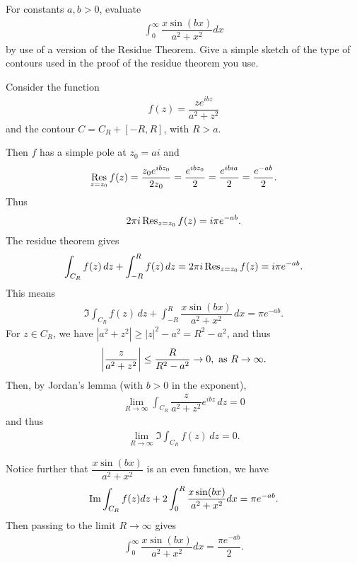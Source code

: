 \begin{problem}
\label{prob:xsinbx}For constants $a,b>0$, evaluate 
\begin{align*}
    \int_0^\infty\dfrac{x\sin(bx)}{a^2+x^2}dx
\end{align*}
by use of a version of the Residue Theorem. Give a simple sketch of the type of contours used in the proof of the residue theorem you use.
\begin{solution}
Consider the function 
\begin{align*}
    f(z)=\dfrac{ze^{ibz}}{a^2+z^2}
\end{align*}
and the contour $C=C_R+[-R,R]$, with $R>a.$ 

Then $f$ has a simple pole at $z_0=ai$ and 
\begin{align*}
    \mathop{\rm Res}_{z=z_0}f(z)=\dfrac{z_0e^{ibz_0}}{2z_0}=\dfrac{e^{ibz_0}}{2}=\dfrac{e^{ibia}}{2}=\dfrac{e^{-ab}}{2}.
\end{align*}
Thus 
\begin{align*}
    2\pi i \operatorname{Res}_{z=z_0}f(z)=i\pi e^{-ab}.
\end{align*}
The residue theorem gives 
\begin{align*}
    \int_{C_R} f(z) \,dz + \int_{-R}^R f(z) \,dz = 2\pi i \operatorname{Res}_{z=z_0} f(z) = i\pi e^{-ab}.
\end{align*}
This means 
\begin{align*}
    \Im \int_{C_R} f(z) \,dz + \int_{-R}^R \dfrac{x\sin(bx)}{a^2 + x^2} \,dx = \pi e^{-ab}.
\end{align*}
For $z \in C_R$, we have $|a^2 + z^2|\ge |z|^2 - a^2 = R^2 - a^2$, and thus 
\begin{align*}
\left\lvert \dfrac{z}{a^2 + z^2}\right\rvert \le \dfrac{R}{R^2 - a^2} \to 0, \text{ as } R \to \infty.
\end{align*}
Then, by Jordan's lemma (with $b>0$ in the exponent),
\begin{align*}
    \lim_{R \to \infty} \int_{C_R} \dfrac{z}{a^2 + z^2} e^{ibz} \,dz = 0
\end{align*}
and thus 
\begin{align*}
    \lim_{R \to \infty} \Im \int_{C_R} f(z) \,dz = 0.
\end{align*}


Notice further that $\dfrac{x\sin(bx)}{a^2+x^2}$ is an even function, we have 
\begin{align*}
    {\rm Im}  \int_{C_R}f(z)dz+2\int_{0}^R\dfrac{x\sin(bx)}{a^2+x^2} dx=\pi e^{-ab}.
\end{align*}
Then passing to the limit $R \to \infty$ gives 
\begin{align*}
    \int_0^\infty\dfrac{x\sin(bx)}{a^2+x^2}dx=\dfrac{\pi e^{-ab}}{2}.
\end{align*}
\end{solution}
\end{problem}

